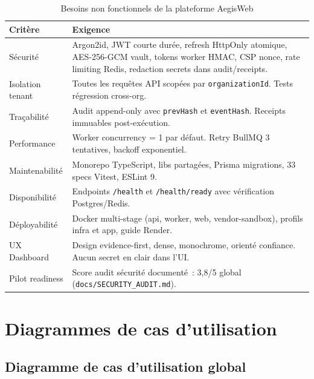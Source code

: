 \begin{table}[H]
\centering
\caption{Besoins non fonctionnels de la plateforme AegisWeb}
\label{tab:bnf}
\begin{tabularx}{\textwidth}{@{}p{2.5cm}X@{}}
\toprule
\textbf{Critère}     & \textbf{Exigence} \\
\midrule
\rowcolor{rowgray}
Sécurité             & Argon2id, JWT courte durée, refresh HttpOnly atomique,
                       AES-256-GCM vault, tokens worker HMAC, CSP nonce,
                       rate limiting Redis, redaction secrets dans audit/receipts. \\
Isolation tenant     & Toutes les requêtes API scopées par
                       \texttt{organizationId}. Tests régression cross-org. \\
\rowcolor{rowgray}
Traçabilité          & Audit append-only avec \texttt{prevHash} et
                       \texttt{eventHash}. Receipts immuables post-exécution. \\
Performance          & Worker concurrency = 1 par défaut. Retry BullMQ
                       3 tentatives, backoff exponentiel. \\
\rowcolor{rowgray}
Maintenabilité       & Monorepo TypeScript, libs partagées, Prisma migrations,
                       33 specs Vitest, ESLint 9. \\
Disponibilité        & Endpoints \texttt{/health} et \texttt{/health/ready}
                       avec vérification Postgres/Redis. \\
\rowcolor{rowgray}
Déployabilité        & Docker multi-stage (api, worker, web, vendor-sandbox),
                       profils infra et app, guide Render. \\
UX Dashboard         & Design evidence-first, dense, monochrome, orienté
                       confiance. Aucun secret en clair dans l'UI. \\
\rowcolor{rowgray}
Pilot readiness      & Score audit sécurité documenté~: 3,8/5 global
                       (\texttt{docs/SECURITY\_AUDIT.md}). \\
\bottomrule
\end{tabularx}
\end{table}

\section{Diagrammes de cas d'utilisation}

\subsection{Diagramme de cas d'utilisation global}

